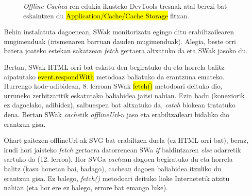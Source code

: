 \begin{figure}[ht]
	\centering
{}
\caption{\textit{Offline Cachea}-ren edukia ikusteko DevTools tresnak atal berezi bat eskaintzen du \hl{Application/Cache/Cache Storage} fitxan.}
\label{fig:serviceworker6}
\end{figure}

Behin instalatuta dagoenean, SWak monitorizatu egingo ditu erabiltzailearen mugimenduak (irismenaren barruan dauden mugimenduak). Alegia, beste orri batera joateko estekan sakatzean \textit{fetch} gertaera altxatuko da eta SWak jasoko du. 

Bertan, SWak HTML orri bat eskatu den begiratuko du eta horrela balitz aipatutako \hl{event.respondWith} metodoaz baliatuko da erantzuna emateko. Hurrengo kode-adibidean,  8. lerroan SWak \hl{fetch()} metodoari deituko dio, urruneko zerbitzaritik eskatutako baliabidea jaitsi nahian. Ezin badu (konexiorik ez dagoelako, adibidez), salbuespen bat altxatuko da, \textit{catch} blokean tratatuko dena. Bertan SWak \textit{cache}tik \textit{offlineUrl}-a jaso eta erabiltzaileari bidaliko dio erantzun gisa.

Ohart gaitezen offlineUrl-ak SVG bat erabiltzen duela (ez HTML orri bat), beraz, irudi hori jaisteko \textit{fetch} gertaera datorrenean SWa \textit{if} baldintzaren \textit{else} adarretik sartuko da (12. lerroa). Hor SVGa \textit{cache}an dagoen begiratuko du eta horrela balitz (kasu honetan bai, badago), cachean dagoen baliabidea itzuliko du erantzun gisa. Ez balego, \textit{fetch()} metodoari deituko lioke Internetetik atzitu nahian (eta hor ere ez balego, errore bat emango luke).

